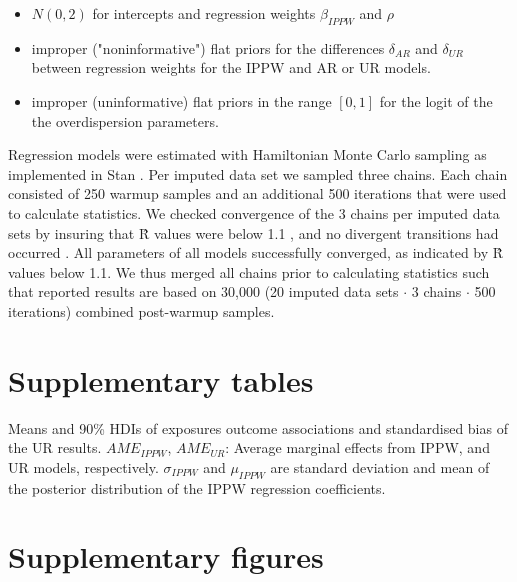 \documentclass[12pt]{article}
\begin{document}
\begin{itemize}
	\item $N(0,2)$ for intercepts and regression weights $\beta_{IPPW}$ and $\rho$
	\item improper ("noninformative") flat priors for the differences $\delta_{AR}$ and $\delta_{UR}$ between regression weights for the IPPW and AR or UR models.
	\item improper (uninformative) flat priors in the range $[0,1]$ for the logit of the the overdispersion parameters.
\end{itemize}


Regression models were estimated with Hamiltonian Monte Carlo sampling as implemented in Stan \cite{Stan_Development_Team2017-lp, Stan_Development_Team_2018-rs}. Per imputed data set we sampled three chains. Each chain consisted of 250 warmup samples and an additional 500 iterations that were used to calculate statistics. We checked convergence of the 3 chains per imputed data sets by insuring that \^{R} values were below 1.1 \cite{Gelman1992-jz}, and no divergent transitions had occurred \cite{Stan_Development_Team2016-pc}. All parameters of all models successfully converged, as indicated by \^{R} values below 1.1. We thus merged all chains prior to calculating statistics \cite{Zhou2010-li} such that reported results are based on 30,000 (20 imputed data sets $\cdot$ 3 chains $\cdot$ 500 iterations) combined post-warmup samples.

\newpage

\section{Supplementary tables}





\begin{sidewaystable}
	
	\caption{Means and 90\% HDIs of exposures outcome associations and standardised bias of the UR results.
		$AME_{IPPW}$, $AME_{UR}$: Average marginal effects from IPPW, and UR models, respectively. $\sigma_{IPPW}$ and $\mu_{IPPW}$ are standard deviation and mean of the posterior distribution of the IPPW regression coefficients. } 
	\label{tab:estimates-UR}
\end{sidewaystable}
\newpage

\section{Supplementary figures}
\end{document}
